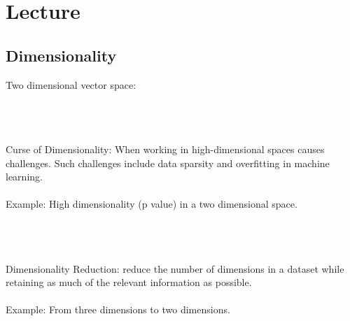 \section{Lecture}
\subsection{Dimensionality}
Two dimensional vector space:\\\\
\\\\
Curse of Dimensionality: When working in high-dimensional spaces causes challenges. Such challenges include data sparsity and overfitting in machine learning. \\\\
Example:  High dimensionality (p value) in a two dimensional space.\\\\
\\\\
Dimensionality Reduction: reduce the number of dimensions in a dataset while retaining as much of the relevant information as possible. \\\\
Example: From three dimensions to two dimensions. \\

